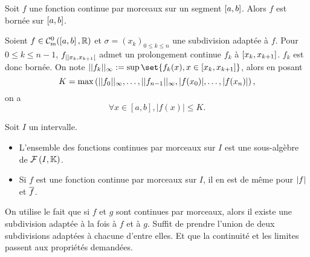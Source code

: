 \documentclass{magnolia}
\begin{document}
\begin{proposition}[utile=3]
Soit $f$ une fonction continue par morceaux sur un segment $\left[a,b\right]$.
Alors $f$ est bornée sur $\left[a,b\right]$.
\end{proposition}

\begin{preuve}
Soient $f\in \mathcal{C}_{{\rm m}}^0(\left[a,b\right],\mathbb{R})$ et $\sigma=(x_k)_{0\leq k\leq n}$ une subdivision adaptée à $f$. Pour $0\leq k \leq n-1$, $f_{|\left]x_k,x_{k+1}\right[}$ admet un prolongement continue $f_k$ à $\left[x_k,x_{k+1}\right]$. $f_k$ est donc bornée. On note $||f_k||_{\infty}:=\sup\set{f_k(x), x \in \interf{x_k}{x_{k+1}}}$, alors en posant $$K=\max\left(||f_0||_{\infty},\ldots,||f_{n-1}||_{\infty},|f(x_0)|,\ldots,|f(x_n)|\right),$$ on a $$\forall x \in [a,b], |f(x)|\leq K.$$
\end{preuve}


\begin{proposition}[utile=-3]
Soit $I$ un intervalle.
\begin{itemize}
\item L'ensemble des fonctions continues par morceaux sur $I$ est une
  sous-algèbre de $\mathcal{F}\left(I,\mathbb{K}\right)$.
\item Si $f$ est une fonction continue par morceaux sur $I$, il en est de même pour $\left|f\right|$ et $\overline{f}$.
\end{itemize}
\end{proposition}

\begin{preuve}
On utilise le fait que si $f$ et $g$ sont continues par morceaux, alors il existe une
subdivision adaptée à la fois à $f$ et à $g$. Suffit de prendre l'union de deux subdivisions adaptées à chacune d'entre elles. Et que la continuité et les limites passent aux propriétés demandées.
\end{preuve}
\end{document}
